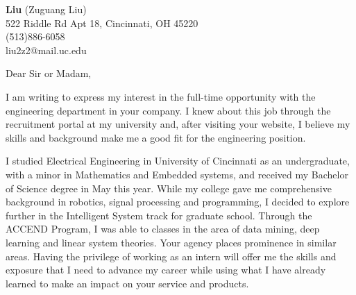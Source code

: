 \documentclass[11pt]{letter} %
\begin{document}

\begin{letter}
{\vspace{-15pt}}


\begin{center}
\large \textbf{Liu} (Zuguang Liu) \\ %
522 Riddle Rd Apt 18, Cincinnati, OH 45220 \\ (513)886-6058  \\ liu2z2@mail.uc.edu%
\end{center}


\signature{Liu (Zuguang Liu)} %


\opening{Dear Sir or Madam,}

\par I am writing to express my interest in the full-time opportunity with the engineering department in your company.
I knew about this job through the recruitment portal at my university and, after visiting your website, I believe my skills and background make me a good fit for the engineering position.

\par I studied Electrical Engineering in University of Cincinnati as an undergraduate, with a minor in Mathematics and Embedded systems, and received my Bachelor of Science degree in May this year.
While my college gave me comprehensive background in robotics, signal processing and programming, I decided to explore further in the Intelligent System track for graduate school.
Through the ACCEND Program, I was able to classes in the area of data mining, deep learning and linear system theories.
Your agency places prominence in similar areas.
Having the privilege of working as an intern will offer me the skills and exposure that I need to advance my career while using what I have already learned to make an impact on your service and products.


\end{letter}
\end{document}
